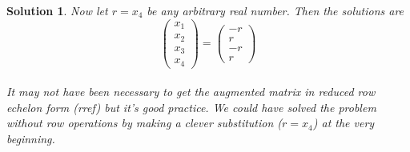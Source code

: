 \documentclass{article}
\newtheorem*{solution}{Solution}
\begin{document}
\begin{solution}
Now let $r = x_{4}$ be any arbitrary real number. Then the solutions are \\

\begin{equation*}
\begin{pmatrix}
x_{1} \\ x_{2} \\ x_{3} \\ x_{4}
\end{pmatrix}
=
\begin{pmatrix}
-r \\ r \\ -r \\ r
\end{pmatrix}
\end{equation*} \\

It may not have been necessary to get the augmented matrix in reduced row echelon form (rref) but it's good practice. We could have solved the problem without row operations by making a clever substitution ($r = x_{4}$) at the very beginning.

\end{solution}
\end{document}
